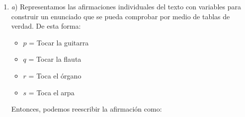 \documentclass[11pt,a4paper]{article}
\begin{document}
\begin{enumerate}
\vspace{0.5cm}

\textit{f}) 

Sean $x, y, \in \mathbb{Z}$ tales que $x > y$, entonces $ 0 < y -x$, y podemos reescribir $ 0 < \dfrac{1}{y-x}$ sin pérdida de generalidad. 

Sea $n \in 	\mathbb{N}$ tal que $\dfrac{1}{y-x} < n, \underbrace{1 < ny - nx}_{(1)}$

Sea $m \in \mathbb{N}$ tal que $m \le nx < m + 1$. Restando $m$ obtenemos $\underbrace{0 \le nx - m < 1}_{(2)}$

Relacionando (1) con (2)

\begin{center}
    $0 \le nx - m < 1 < ny-nx$
    
    $\underbrace{nx - m < 1 < ny-nx}_{(3)}$
\end{center}

Sumando $m$ a (3) 

\begin{center}
    $nx < 1 + m < ny - nx + m$ 
\end{center}

Como $m \le nx$; $-nx \le -m$; 

\begin{center}
$-nx + ny \le -m+ny$

$ny - nx + m \le ny$
\end{center}

Por ende, tenemos 

\begin{center}
    $nx < 1 + m < ny$
    
    $x < \dfrac{1 + m}{n} < y$, siendo $\dfrac{1 + m}{n}$ un número racional
\end{center}

\item


\textit{a}) Representamos las afirmaciones individuales del texto con variables para construir un enunciado que se pueda comprobar por medio de tablas de verdad. De esta forma:

\begin{itemize}
\item $p$ = Tocar la guitarra
\item $q$ = Tocar la flauta
\item $r$ = Toca el órgano
\item  $s$ = Toca el arpa
\end{itemize}
Entonces, podemos reescribir la afirmación como:


\end{enumerate}
\end{document}
